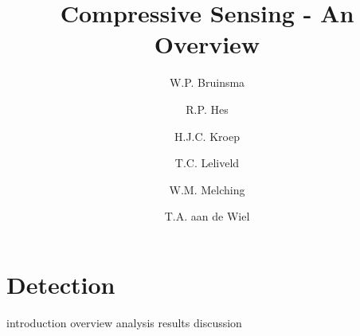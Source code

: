 \documentclass[a4paper, openany, oneside]{memoir}
\title{Compressive Sensing - An Overview}
\author{W.P. Bruinsma \and R.P. Hes \and H.J.C. Kroep \and T.C. Leliveld \and W.M. Melching \and T.A. aan de Wiel}
\begin{document}
\chapter{Detection}

{introduction}
{overview}
{analysis}
{results}
{discussion}
\end{document}
